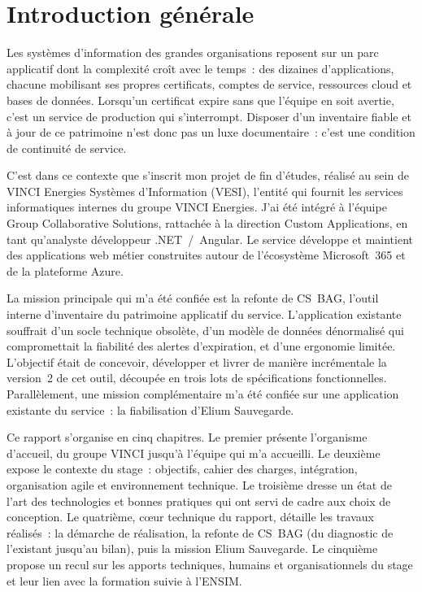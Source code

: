 \chapter*{Introduction générale}

Les systèmes d'information des grandes organisations reposent sur un parc
applicatif dont la complexité croît avec le temps~: des dizaines d'applications,
chacune mobilisant ses propres certificats, comptes de service, ressources cloud
et bases de données. Lorsqu'un certificat expire sans que l'équipe en soit
avertie, c'est un service de production qui s'interrompt. Disposer d'un
inventaire fiable et à jour de ce patrimoine n'est donc pas un luxe
documentaire~: c'est une condition de continuité de service.

C'est dans ce contexte que s'inscrit mon projet de fin d'études, réalisé au sein
de VINCI Energies Systèmes d'Information (VESI), l'entité qui fournit les
services informatiques internes du groupe VINCI Energies. J'ai été intégré à
l'équipe Group Collaborative Solutions, rattachée à la direction Custom
Applications, en tant qu'analyste développeur .NET~/~Angular. Le service
développe et maintient des applications web métier construites autour de
l'écosystème Microsoft~365 et de la plateforme Azure.

La mission principale qui m'a été confiée est la refonte de CS~BAG, l'outil
interne d'inventaire du patrimoine applicatif du service. L'application
existante souffrait d'un socle technique obsolète, d'un modèle de données
dénormalisé qui compromettait la fiabilité des alertes d'expiration, et d'une
ergonomie limitée. L'objectif était de concevoir, développer et livrer de
manière incrémentale la version~2 de cet outil, découpée en trois lots de
spécifications fonctionnelles. Parallèlement, une mission complémentaire
m'a été confiée sur une application existante du service~: la
fiabilisation d'Elium Sauvegarde.

Ce rapport s'organise en cinq chapitres. Le premier présente l'organisme
d'accueil, du groupe VINCI jusqu'à l'équipe qui m'a accueilli. Le deuxième
expose le contexte du stage~: objectifs, cahier des charges, intégration,
organisation agile et environnement technique. Le troisième dresse un état de
l'art des technologies et bonnes pratiques qui ont servi de cadre aux choix de
conception. Le quatrième, cœur technique du rapport, détaille les travaux
réalisés~: la démarche de réalisation, la refonte de CS~BAG (du diagnostic
de l'existant jusqu'au bilan), puis la mission Elium Sauvegarde.
Le cinquième propose un recul sur les apports techniques,
humains et organisationnels du stage et leur lien avec la formation suivie à
l'ENSIM.
